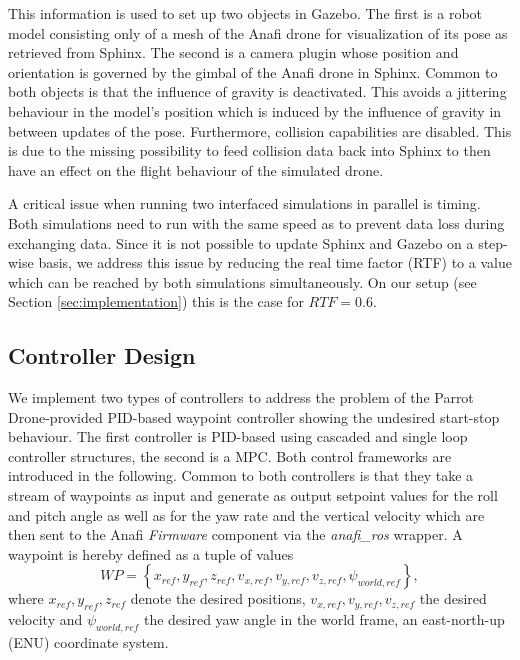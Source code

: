 This information is used to set up two  objects in Gazebo. The first is a robot model consisting only of a mesh  of the Anafi drone for visualization of its pose as retrieved from Sphinx.  The second is a camera plugin whose position and orientation is governed by the gimbal of the Anafi drone in Sphinx. Common to both objects is that the influence of gravity is deactivated. This avoids a jittering behaviour in the model's position which is induced by the influence of gravity in between updates of the pose. Furthermore, collision capabilities are disabled. This is due to the missing possibility to feed collision data back into Sphinx to then have an effect on the flight behaviour of the simulated drone.

A critical issue when  running two interfaced simulations in parallel is timing. Both simulations need to run with the same speed as to prevent data loss during exchanging data. Since it is not possible to update Sphinx and Gazebo on a step-wise basis, we address this issue by reducing the real time factor (RTF) to a value which can be reached by both simulations simultaneously. On our setup (see Section \ref{sec:implementation}) this is the case for $RTF =0.6$.


\subsection{Controller Design}
We implement two types of controllers to address the problem of the Parrot Drone-provided PID-based waypoint controller showing the undesired start-stop behaviour. The first controller is PID-based using cascaded and single loop controller structures, the second is a MPC. Both control frameworks are introduced in the following. Common to both controllers is that they take  a stream of waypoints as input and generate as output setpoint values for the roll and pitch angle as well as for the yaw rate and the vertical velocity which are then sent to the Anafi \textit{Firmware} component via the \textit{anafi_ros} wrapper.
A waypoint is hereby defined as a tuple of values
\begin{equation}
WP = \left\lbrace x_{ref},y_{ref},z_{ref},v_{x,ref},v_{y,ref},v_{z,ref},\psi_{world,ref}\right\rbrace,
\end{equation} 
where $x_{ref},y_{ref},z_{ref}$ denote the desired positions, $v_{x,ref},v_{y,ref},v_{z,ref}$ the desired velocity and $\psi_{world,ref}$ the desired yaw angle in the world frame, an east-north-up (ENU) coordinate system.
